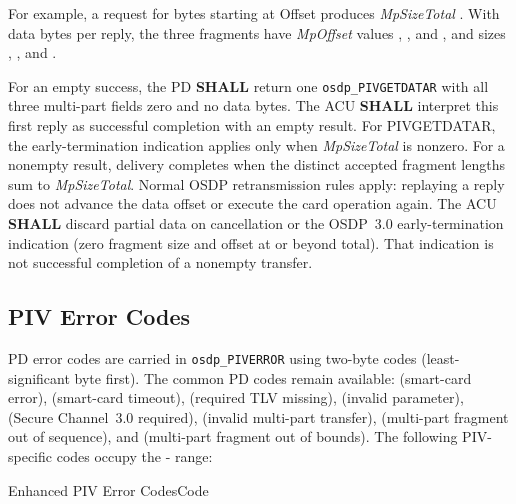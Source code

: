 For example, a request for  bytes starting at Offset 
produces \emph{MpSizeTotal} . With  data bytes per
reply, the three fragments have \emph{MpOffset} values ,
, and , and sizes , ,
and .

For an empty success, the PD \textbf{SHALL} return one \texttt{osdp\_PIVGETDATAR}
with all three multi-part fields zero and no data bytes.
The ACU \textbf{SHALL} interpret this first reply as successful completion
with an empty result. For PIVGETDATAR, the early-termination indication
applies only when \emph{MpSizeTotal} is nonzero.
For a nonempty result, delivery completes when the distinct accepted fragment lengths
sum to \emph{MpSizeTotal}. Normal OSDP retransmission rules apply: replaying a
reply does not advance the data offset or execute the card operation again.
The ACU \textbf{SHALL} discard partial data on cancellation or the OSDP~3.0
early-termination indication (zero fragment size and offset at or beyond total).
That indication is not successful completion of a nonempty transfer.

\subsection{PIV Error Codes}\label{sec:new-piv-error-codes}

PD error codes are carried in \texttt{osdp\_PIVERROR} using two-byte codes
(least-significant byte first). The common PD codes remain available:
 (smart-card error),
 (smart-card timeout),  (required TLV missing),
 (invalid parameter),  (Secure Channel~3.0 required),
 (invalid multi-part transfer),
 (multi-part fragment out of sequence), and
 (multi-part fragment out of bounds).
The following PIV-specific codes occupy the - range:

\begin{ValueDescriptionTable}{Enhanced PIV Error Codes}{Code}
\end{ValueDescriptionTable}


